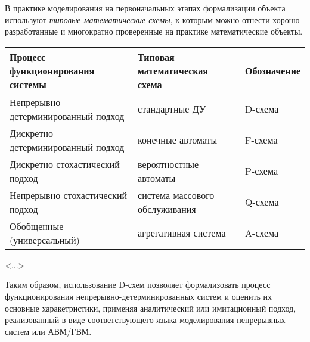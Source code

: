 В практике моделирования на первоначальных этапах формализации объекта используют \textit{типовые математические схемы}, к которым можно отнести хорошо разработанные и многократно проверенные на практике математические объекты.

\begin{table}
    \renewcommand{\arraystretch}{1.5}
    \begin{tabularx}{\textwidth} {
            >{\raggedright\arraybackslash}X
            >{\centering\arraybackslash}X
            >{\centering\arraybackslash}X}
        \toprule
        \textbf{Процесс функционирования системы} & \textbf{Типовая математическая схема} & \textbf{Обозначение} \\
        \midrule
        Непрерывно-детерминированный подход       & стандартные ДУ                        & D-схема              \\
        Дискретно-детерминированный подход        & конечные автоматы                     & F-схема              \\
        Дискретно-стохастический подход           & вероятностные автоматы                & P-схема              \\
        Непрерывно-стохастический подход          & система массового обслуживания        & Q-схема              \\
        Обобщенные (универсальный)                & агрегативная система                  & A-схема              \\
        \bottomrule
    \end{tabularx}
\end{table}

<...>

Таким образом, использование D-схем позволяет формализовать процесс функционирования непрерывно-детерминированных систем и оценить их основные харакетристики, применяя аналитический или имитационный подход, реализованный в виде соответствующего языка моделирования непрерывных систем или АВМ/ГВМ.